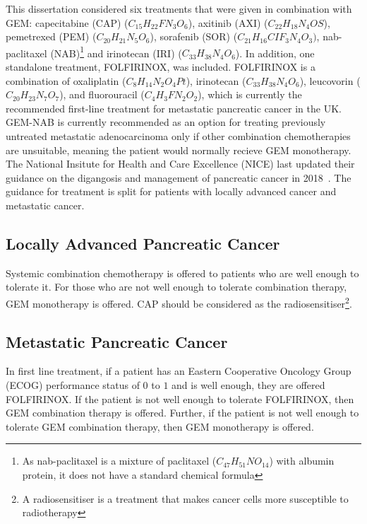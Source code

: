 This dissertation considered six treatments that were given in combination with GEM: capecitabine (CAP) ($C_{15}H_{22}FN_3O_6$), axitinib (AXI) ($C_{22}H_{18}N_4OS$), pemetrexed (PEM) ($C_{20}H_{21}N_5O_6$), sorafenib (SOR) ($C_{21}H_{16}CIF_{3}N_4O_3)$, nab-paclitaxel (NAB)\footnote{As nab-paclitaxel is a mixture of paclitaxel ($C_{47}H_{51}NO_{14}$) with albumin protein, it does not have a standard chemical formula} and irinotecan (IRI) ($C_{33}H_{38}N_4O_6$). In addition, one standalone treatment, FOLFIRINOX, was included. FOLFIRINOX is a combination of oxaliplatin ($C_{8}H_{14}N_{2}O_{4}Pt$), irinotecan ($C_{33}H_{38}N_{4}O_{6}$), leucovorin ($C_{20}H_{23}N_{7}O_{7}$), and fluorouracil ($C_{4}H_{3}FN_{2}O_{2}$), which is currently the recommended first-line treatment for metastatic pancreatic cancer in the UK. GEM-NAB is currently recommended as an option for treating previously untreated metastatic adenocarcinoma only if other combination chemotherapies are unsuitable, meaning the patient would normally recieve GEM monotherapy.\\

The National Insitute for Health and Care Excellence (NICE) last updated their guidance on the digangosis and management of pancreatic cancer in 2018~\cite{NG85}. The guidance for treatment is split for patients with locally advanced cancer and metastatic cancer.

\subsection{Locally Advanced Pancreatic Cancer}
Systemic combination chemotherapy is offered to patients who are well enough to tolerate it. For those who are not well enough to tolerate combination therapy, GEM monotherapy is offered. CAP should be considered as the radiosensitiser\footnote{A radiosensitiser is a treatment that makes cancer cells more susceptible to radiotherapy}.

\subsection{Metastatic Pancreatic Cancer}
In first line treatment, if a patient has an Eastern Cooperative Oncology Group (ECOG) performance status of $0$ to $1$ and is well enough, they are offered FOLFIRINOX. If the patient is not well enough to tolerate FOLFIRINOX, then GEM combination therapy is offered. Further, if the patient is not well enough to tolerate GEM combination therapy, then GEM monotherapy is offered.  \\

